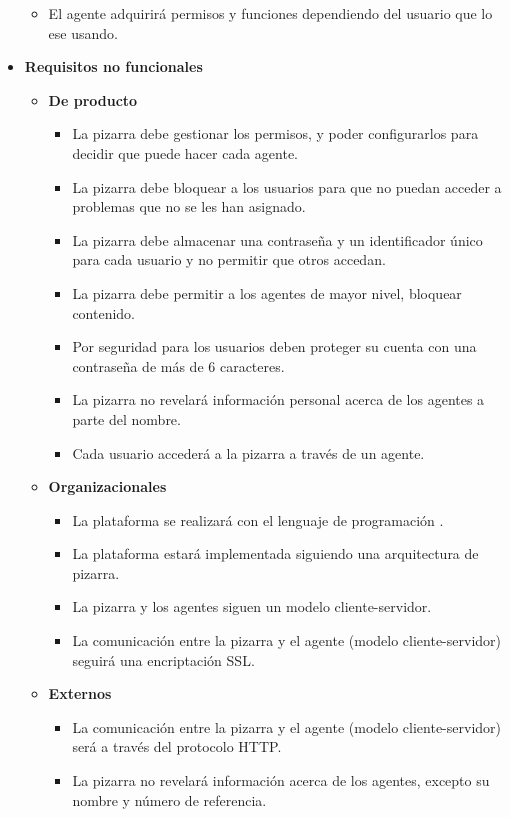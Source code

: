 \begin{itemize}
\begin{itemize}
			\item El agente adquirirá permisos y funciones dependiendo del usuario que lo ese usando.
		\end{itemize}
\item \textbf{Requisitos no funcionales}
		\begin{itemize}
			\item \textbf{De producto}
					\begin{itemize}
					\item La pizarra debe gestionar los permisos, y poder configurarlos para decidir que puede hacer cada agente.
					\item La pizarra debe bloquear a los usuarios para que no puedan acceder a problemas que no se les han asignado.
					\item La pizarra debe almacenar una contraseña y un identificador único para cada usuario y no permitir que otros accedan.
					\item La pizarra debe permitir a los agentes de mayor nivel, bloquear contenido.
					\item Por seguridad para los usuarios deben proteger su cuenta con una contraseña de más de 6 caracteres.
					\item La pizarra no revelará información personal acerca de los agentes a parte del nombre.
					\item Cada usuario accederá a la pizarra a través de un agente.
					\end{itemize}
			\item \textbf{Organizacionales}
					\begin{itemize}
					\item La plataforma se realizará con el lenguaje de programación .
					\item La plataforma estará implementada siguiendo una arquitectura de pizarra.
					\item La pizarra y los agentes siguen un modelo cliente-servidor.
					\item La comunicación entre la pizarra y el agente (modelo cliente-servidor) seguirá una encriptación SSL.
					\end{itemize}
			\item \textbf{Externos}
					\begin{itemize}
					\item La comunicación entre la pizarra y el agente (modelo cliente-servidor) será a través del protocolo HTTP.
					\item La pizarra no revelará información acerca de los agentes, excepto su nombre y número de referencia.
					\end{itemize}
		\end{itemize}
\end{itemize}

